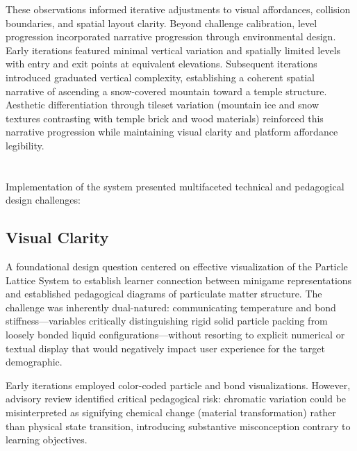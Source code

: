 These observations informed iterative adjustments to visual affordances, collision boundaries, and spatial layout clarity. Beyond challenge calibration, level progression incorporated narrative progression through environmental design. Early iterations featured minimal vertical variation and spatially limited levels with entry and exit points at equivalent elevations. Subsequent iterations introduced graduated vertical complexity, establishing a coherent spatial narrative of ascending a snow-covered mountain toward a temple structure. Aesthetic differentiation through tileset variation (mountain ice and snow textures contrasting with temple brick and wood materials) reinforced this narrative progression while maintaining visual clarity and platform affordance legibility.

\section{\texorpdfstring{}{Particle Lattice Minigame Mechanics}}

Implementation of the  system presented multifaceted technical and pedagogical design challenges:

\subsection{Visual Clarity}

A foundational design question centered on effective visualization of the Particle Lattice System to establish learner connection between minigame representations and established pedagogical diagrams of particulate matter structure. The challenge was inherently dual-natured: communicating temperature and bond stiffness---variables critically distinguishing rigid solid particle packing from loosely bonded liquid configurations---without resorting to explicit numerical or textual display that would negatively impact user experience for the target demographic.

Early iterations employed color-coded particle and bond visualizations. However, advisory review identified critical pedagogical risk: chromatic variation could be misinterpreted as signifying chemical change (material transformation) rather than physical state transition, introducing substantive misconception contrary to learning objectives.

